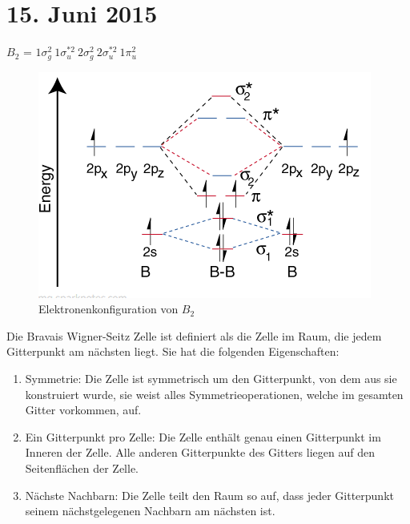 \section{15. Juni 2015}

\label{q:31}

$B_2$ = $1\sigma_g^2 ~ 1\sigma_u^{*2} ~ 2\sigma_g^2 ~ 2\sigma_u^{*2} ~ 1\pi_u^2$ \\

\begin{figure}[H]
    \includegraphics[width=0.8\linewidth]{resources/15-06-2015/b2.PNG}
    \caption{Elektronenkonfiguration von $B_2$}
\end{figure}

\label{q:32}

\label{q:33}

Die Bravais Wigner-Seitz Zelle ist definiert als die Zelle im Raum, die jedem Gitterpunkt am nächsten 
liegt. Sie hat die folgenden Eigenschaften:
\begin{enumerate}
    \item Symmetrie: Die Zelle ist symmetrisch um den Gitterpunkt, von dem aus sie konstruiert wurde, sie weist alles Symmetrieoperationen, welche im gesamten Gitter vorkommen, auf. 
    \item Ein Gitterpunkt pro Zelle: Die Zelle enthält genau einen Gitterpunkt im Inneren der Zelle. Alle anderen Gitterpunkte des Gitters liegen auf den Seitenflächen der Zelle.
    \item Nächste Nachbarn: Die Zelle teilt den Raum so auf, dass jeder Gitterpunkt seinem nächstgelegenen Nachbarn am nächsten ist.
\end{enumerate}

